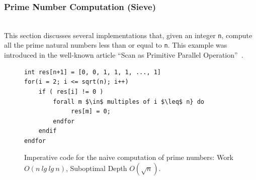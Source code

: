 \documentclass[acmsmall,review]{acmart}\settopmatter{printfolios=true,printccs=false,printacmref=false}
\begin{document}
%

\subsubsection{Prime Number Computation (Sieve)}
\label{subsubsub:primes}
$\mbox{ }$\\

This section discusses several implementations that, given
an integer {\tt n}, compute all the prime natural numbers 
less than or equal to {\tt n}. This example was introduced
in the well-known article ``Scan as Primitive Parallel 
Operation''~\cite{segScan}.

\begin{figure}
\begin{lstlisting}[mathescape=true]
int res[n+1] = [0, 0, 1, 1, 1, ..., 1]
for(i = 2; i <= sqrt(n); i++)
    if ( res[i] != 0 )
        forall m $\in$ multiples of i $\leq$ n} do
             res[m] = 0;
        endfor
    endif
endfor
\end{lstlisting}\vspace{-4ex}
\caption{Imperative code for the naive computation of prime numbers:
         Work $O(n~lg~lg~n)$, Suboptimal Depth $O(\sqrt{n})$. }
\label{fig:primes-naive-Imp}
\end{figure}
\end{document}
